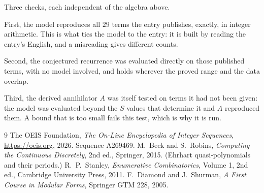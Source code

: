 \documentclass[11pt,a4paper]{article}
\theoremstyle{plain}
\theoremstyle{definition}
\begin{document}
Three checks, each independent of the algebra above.

First, the model reproduces all $29$ terms the entry publishes, exactly, in integer
arithmetic. This is what ties the model to the entry: it is built by reading the entry's
English, and a misreading gives different counts.

Second, the conjectured recurrence was evaluated directly on those published terms, with no
model involved, and holds wherever the proved range and the data overlap.

Third, the derived annihilator $A$ was itself tested on terms it had not been given: the model
was evaluated beyond the $S$ values that determine it and $A$ reproduced them. A bound that is
too small fails this test, which is why it is run.

\begin{thebibliography}{9}
 The OEIS Foundation, \emph{The On-Line Encyclopedia of Integer
Sequences}, \url{https://oeis.org}, 2026. Sequence A269469.
 M.~Beck and S.~Robins, \emph{Computing the Continuous Discretely},
2nd ed., Springer, 2015. (Ehrhart quasi-polynomials and their periods.)
 R.~P.~Stanley, \emph{Enumerative Combinatorics}, Volume 1, 2nd ed.,
Cambridge University Press, 2011.
 F.~Diamond and J.~Shurman, \emph{A First Course in Modular Forms},
Springer GTM 228, 2005.
\end{thebibliography}
\end{document}
